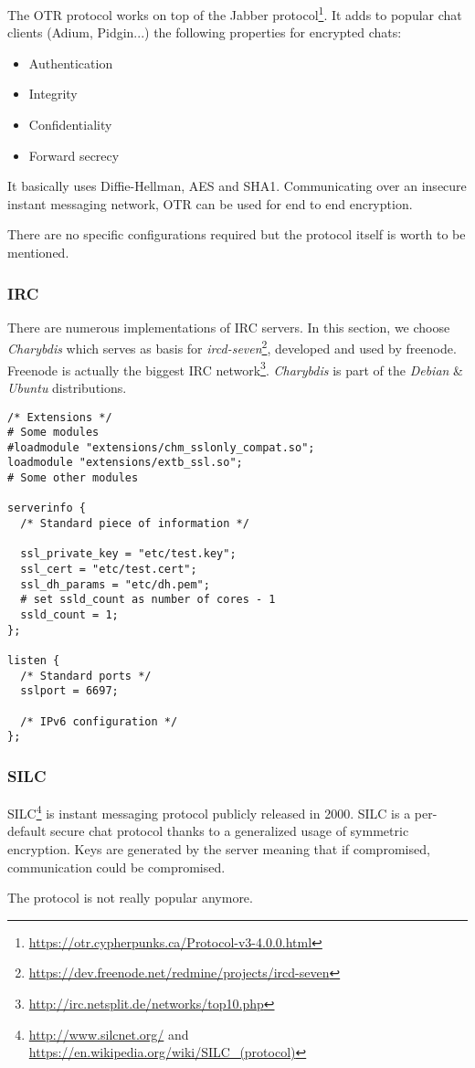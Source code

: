 The OTR protocol works on top of the Jabber protocol\footnote{\url{https://otr.cypherpunks.ca/Protocol-v3-4.0.0.html}}.  
It adds to popular chat clients (Adium, Pidgin...) the following properties for encrypted chats:
\begin{itemize}
    \item Authentication
    \item Integrity
    \item Confidentiality
    \item Forward secrecy
\end{itemize}

It basically uses Diffie-Hellman, AES and SHA1. Communicating over an insecure instant messaging network, OTR can be used for end to end encryption.

There are no specific configurations required but the protocol itself is worth to be mentioned.

\subsubsection{IRC}

There are numerous implementations of IRC servers.  In this section, we choose \emph{Charybdis} which serves as basis for \emph{ircd-seven}\footnote{\url{https://dev.freenode.net/redmine/projects/ircd-seven}}, developed and used by freenode. Freenode is actually the biggest IRC network\footnote{\url{http://irc.netsplit.de/networks/top10.php}}.  \emph{Charybdis} is part of the \emph{Debian} \& \emph{Ubuntu} distributions.

\begin{lstlisting}[breaklines]
/* Extensions */
# Some modules 
#loadmodule "extensions/chm_sslonly_compat.so";
loadmodule "extensions/extb_ssl.so";
# Some other modules

serverinfo {
  /* Standard piece of information */
  
  ssl_private_key = "etc/test.key";
  ssl_cert = "etc/test.cert";
  ssl_dh_params = "etc/dh.pem";
  # set ssld_count as number of cores - 1
  ssld_count = 1; 
};

listen {
  /* Standard ports */
  sslport = 6697;

  /* IPv6 configuration */
};
\end{lstlisting}


\subsubsection{SILC}

SILC\footnote{\url{http://www.silcnet.org/} and
\url{https://en.wikipedia.org/wiki/SILC_(protocol)}} is instant messaging
protocol publicly released in 2000. SILC is a per-default secure chat protocol
thanks to a generalized usage of symmetric encryption. Keys are generated by
the server meaning that if compromised, communication could be compromised.

The protocol is not really popular anymore.




